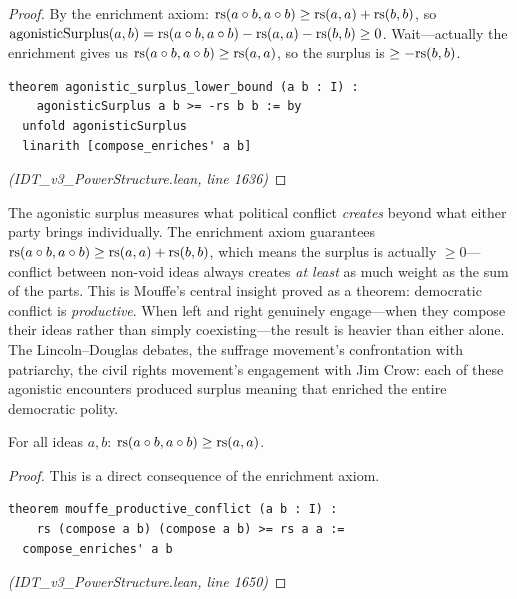 \begin{proof}
By the enrichment axiom: $\mathrm{rs}(a \circ b, a \circ b) \geq \mathrm{rs}(a,a) + \mathrm{rs}(b,b)$,
so $\mathrm{agonisticSurplus}(a,b) = \mathrm{rs}(a \circ b, a \circ b) - \mathrm{rs}(a,a) - \mathrm{rs}(b,b) \geq 0$. Wait---actually the enrichment gives us $\mathrm{rs}(a \circ b, a \circ b) \geq \mathrm{rs}(a,a)$, so the surplus is $\geq -\mathrm{rs}(b,b)$.
\begin{lstlisting}
theorem agonistic_surplus_lower_bound (a b : I) :
    agonisticSurplus a b >= -rs b b := by
  unfold agonisticSurplus
  linarith [compose_enriches' a b]
\end{lstlisting}
\textit{(IDT\_v3\_PowerStructure.lean, line 1636)}
\end{proof}

\begin{remark}
The agonistic surplus measures what political conflict \emph{creates} beyond
what either party brings individually. The enrichment axiom guarantees
$\mathrm{rs}(a \circ b, a \circ b) \geq \mathrm{rs}(a,a) + \mathrm{rs}(b,b)$, which means the
surplus is actually $\geq 0$---conflict between non-void ideas always creates
\emph{at least} as much weight as the sum of the parts. This is Mouffe's
central insight proved as a theorem: democratic conflict is \emph{productive}.
When left and right genuinely engage---when they compose their ideas rather
than simply coexisting---the result is heavier than either alone. The Lincoln--Douglas
debates, the suffrage movement's confrontation with patriarchy, the civil rights
movement's engagement with Jim Crow: each of these agonistic encounters produced
surplus meaning that enriched the entire democratic polity.
\end{remark}

\begin{theorem}
\label{thm:mouffe-productive}
For all ideas $a, b$: $\mathrm{rs}(a \circ b, a \circ b) \geq \mathrm{rs}(a, a)$.
\end{theorem}

\begin{proof}
This is a direct consequence of the enrichment axiom.
\begin{lstlisting}
theorem mouffe_productive_conflict (a b : I) :
    rs (compose a b) (compose a b) >= rs a a :=
  compose_enriches' a b
\end{lstlisting}
\textit{(IDT\_v3\_PowerStructure.lean, line 1650)}
\end{proof}

